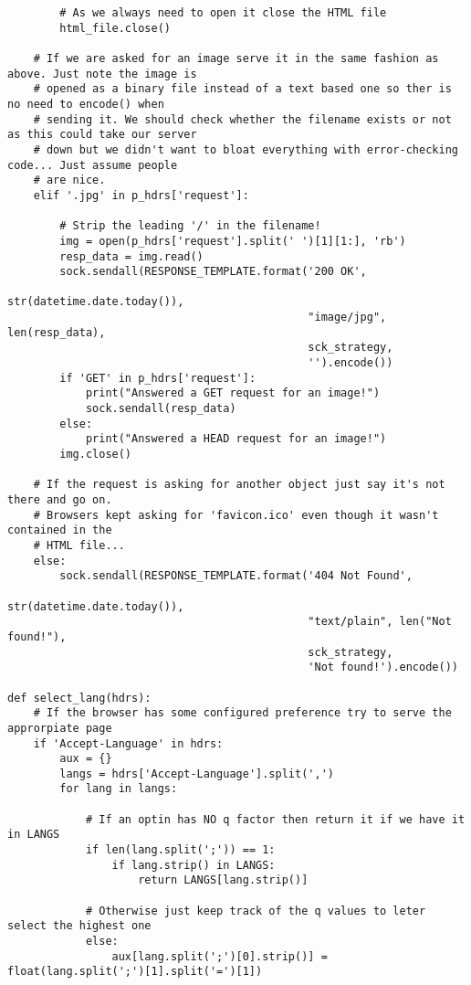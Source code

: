 \documentclass[landscape]{article}
\begin{document}
\begin{verbatim}
        # As we always need to open it close the HTML file
        html_file.close()

    # If we are asked for an image serve it in the same fashion as above. Just note the image is
    # opened as a binary file instead of a text based one so ther is no need to encode() when
    # sending it. We should check whether the filename exists or not as this could take our server
    # down but we didn't want to bloat everything with error-checking code... Just assume people
    # are nice.
    elif '.jpg' in p_hdrs['request']:

        # Strip the leading '/' in the filename!
        img = open(p_hdrs['request'].split(' ')[1][1:], 'rb')
        resp_data = img.read()
        sock.sendall(RESPONSE_TEMPLATE.format('200 OK',
                                              str(datetime.date.today()),
                                              "image/jpg", len(resp_data),
                                              sck_strategy,
                                              '').encode())
        if 'GET' in p_hdrs['request']:
            print("Answered a GET request for an image!")
            sock.sendall(resp_data)
        else:
            print("Answered a HEAD request for an image!")
        img.close()

    # If the request is asking for another object just say it's not there and go on.
    # Browsers kept asking for 'favicon.ico' even though it wasn't contained in the
    # HTML file...
    else:
        sock.sendall(RESPONSE_TEMPLATE.format('404 Not Found',
                                              str(datetime.date.today()),
                                              "text/plain", len("Not found!"),
                                              sck_strategy, 
                                              'Not found!').encode())

def select_lang(hdrs):
    # If the browser has some configured preference try to serve the approrpiate page
    if 'Accept-Language' in hdrs:
        aux = {}
        langs = hdrs['Accept-Language'].split(',')
        for lang in langs:

            # If an optin has NO q factor then return it if we have it in LANGS
            if len(lang.split(';')) == 1:
                if lang.strip() in LANGS:
                    return LANGS[lang.strip()]

            # Otherwise just keep track of the q values to leter select the highest one
            else:
                aux[lang.split(';')[0].strip()] = float(lang.split(';')[1].split('=')[1])


\end{verbatim}
\end{document}
